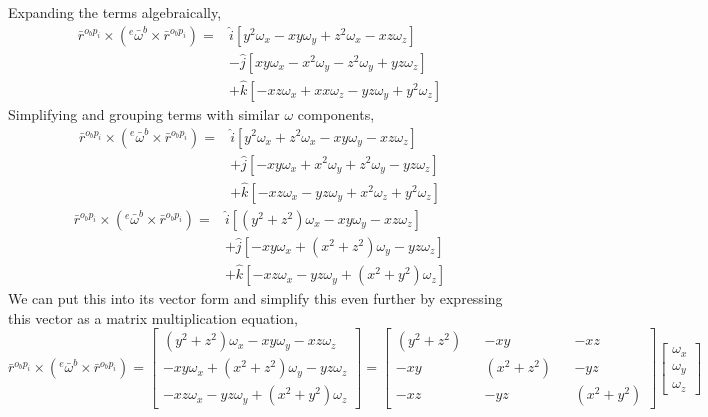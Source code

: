 Expanding the terms algebraically,
\begin{align*}
\bar{r}^{o_{b}p_{i}}\times\left({}^{e}\bar{\omega}^{b}\times\bar{r}^{o_{b}p_{i}}\right) = &
\hat{i}\left[y^{2}\omega_{x} - xy\omega_{y}  + z^{2}\omega_{x} - xz\omega_{z}\right]
\\ & - \hat{j}\left[xy\omega_{x} - x^{2}\omega_{y} - z^{2}\omega_{y} + yz\omega_{z}\right]
\\ & + \hat{k}\left[-xz\omega_{x} + xx\omega_{z} - yz\omega_{y} + y^{2}\omega_{z}\right]
\end{align*}
Simplifying and grouping terms with similar $\omega$ components,
\begin{align*}
\bar{r}^{o_{b}p_{i}}\times\left({}^{e}\bar{\omega}^{b}\times\bar{r}^{o_{b}p_{i}}\right) = &
\hat{i}\left[y^{2}\omega_{x} + z^{2}\omega_{x} - xy\omega_{y} - xz\omega_{z}\right]
\\ & + \hat{j}\left[-xy\omega_{x} + x^{2}\omega_{y} + z^{2}\omega_{y} - yz\omega_{z}\right]
\\ & + \hat{k}\left[-xz\omega_{x} - yz\omega_{y} + x^{2}\omega_{z} + y^{2}\omega_{z}\right]
\end{align*}
\begin{align*}
\bar{r}^{o_{b}p_{i}}\times\left({}^{e}\bar{\omega}^{b}\times\bar{r}^{o_{b}p_{i}}\right) = &
\hat{i}\left[(y^{2}+z^{2})\omega_{x} - xy\omega_{y} - xz\omega_{z}\right]
\\ & + \hat{j}\left[-xy\omega_{x} + (x^{2}+z^{2})\omega_{y} - yz\omega_{z}\right]
\\ & + \hat{k}\left[-xz\omega_{x} - yz\omega_{y} + (x^{2}+y^{2})\omega_{z}\right]
\end{align*}
We can put this into its vector form and simplify this even further by expressing this vector as a matrix multiplication equation,
$$\bar{r}^{o_{b}p_{i}}\times\left({}^{e}\bar{\omega}^{b}\times\bar{r}^{o_{b}p_{i}}\right) = 
\begin{bmatrix}
(y^{2}+z^{2})\omega_{x} - xy\omega_{y} - xz\omega_{z} \\ 
-xy\omega_{x} + (x^{2}+z^{2})\omega_{y} - yz\omega_{z} \\
-xz\omega_{x} - yz\omega_{y} + (x^{2}+y^{2})\omega_{z}
\end{bmatrix} = \begin{bmatrix}
(y^{2}+z^{2}) && - xy &&  - xz \\ 
-xy && (x^{2}+z^{2}) && - yz \\
-xz && - yz && (x^{2}+y^{2})
\end{bmatrix}\begin{bmatrix}
\omega_{x} \\ \omega_{y} \\ \omega_{z}
\end{bmatrix}$$
